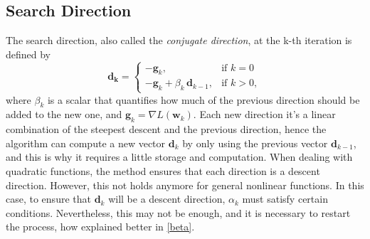 \subsection{Search Direction}\label{search_direction}
The search direction, also called the \emph{conjugate direction}, at the k-th iteration is defined by
\begin{equation}\label{direction}
    \mathbf{d_k} = 
    \begin{cases}
        -\mathbf{g}_k, & \text{if } k=0 \\
        -\mathbf{g}_k + \beta_k \,  \mathbf{d}_{k-1}, & \text{if } k>0, 
    \end{cases} 
\end{equation}
where $\beta_k$ is a scalar that quantifies how much of the previous direction should be added to the new one, and $\mathbf{g}_k =\nabla L(\textbf{w}_k)$. Each new direction it's a linear combination of the steepest descent and the previous direction, hence the algorithm can compute a new vector $\mathbf{d}_k$ by only using the previous vector $\mathbf{d}_{k-1}$, and this is why it requires a little storage and computation. When dealing with quadratic functions, the method ensures that each direction is a descent direction. However, this not holds anymore for general nonlinear functions. In this case, to ensure that $\mathbf{d}_k$ will be a descent direction, $\alpha_k$ must satisfy certain conditions. Nevertheless, this may not be enough, and it is necessary to restart the process, how explained better in \ref{beta}.\\

